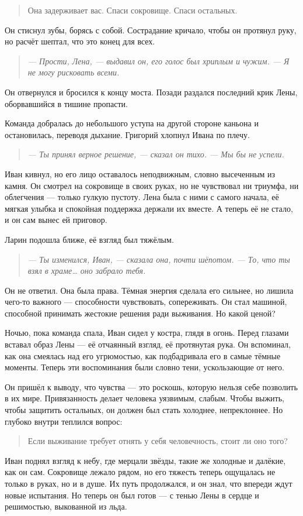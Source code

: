 \documentclass[12pt,a4paper]{book}
\newenvironment{dialogue}{\begin{quote}\itshape}{\end{quote}}
\begin{document}
\begin{quote}
Она задерживает вас. Спаси сокровище. Спаси остальных.
\end{quote}

Он стиснул зубы, борясь с собой. Сострадание кричало, чтобы он протянул руку, но расчёт шептал, что это конец для всех.

\begin{dialogue}
--- Прости, Лена, --- выдавил он, его голос был хриплым и чужим. --- Я не могу рисковать всеми.
\end{dialogue}

Он отвернулся и бросился к концу моста. Позади раздался последний крик Лены, оборвавшийся в тишине пропасти.

Команда добралась до небольшого уступа на другой стороне каньона и остановилась, переводя дыхание. Григорий хлопнул Ивана по плечу.

\begin{dialogue}
--- Ты принял верное решение, --- сказал он тихо. --- Мы бы не успели.
\end{dialogue}

Иван кивнул, но его лицо оставалось неподвижным, словно высеченным из камня. Он смотрел на сокровище в своих руках, но не чувствовал ни триумфа, ни облегчения --- только гулкую пустоту. Лена была с ними с самого начала, её мягкая улыбка и спокойная поддержка держали их вместе. А теперь её не стало, и он сам вынес ей приговор.

Ларин подошла ближе, её взгляд был тяжёлым.

\begin{dialogue}
--- Ты изменился, Иван, --- сказала она, почти шёпотом. --- То, что ты взял в храме… оно забрало тебя.
\end{dialogue}

Он не ответил. Она была права. Тёмная энергия сделала его сильнее, но лишила чего-то важного --- способности чувствовать, сопереживать. Он стал машиной, способной принимать жестокие решения ради выживания. Но какой ценой?

Ночью, пока команда спала, Иван сидел у костра, глядя в огонь. Перед глазами вставал образ Лены --- её отчаянный взгляд, её протянутая рука. Он вспоминал, как она смеялась над его угрюмостью, как подбадривала его в самые тёмные моменты. Теперь эти воспоминания были словно тени, ускользающие от него.

Он пришёл к выводу, что чувства --- это роскошь, которую нельзя себе позволить в их мире. Привязанность делает человека уязвимым, слабым. Чтобы выжить, чтобы защитить остальных, он должен был стать холоднее, непреклоннее. Но глубоко внутри теплился вопрос:

\begin{quote}
Если выживание требует отнять у себя человечность, стоит ли оно того?
\end{quote}

Иван поднял взгляд к небу, где мерцали звёзды, такие же холодные и далёкие, как он сам. Сокровище лежало рядом, но его тяжесть теперь ощущалась не только в руках, но и в душе. Их путь продолжался, и он знал, что впереди ждут новые испытания. Но теперь он был готов --- с тенью Лены в сердце и решимостью, выкованной из льда.
\end{document}
